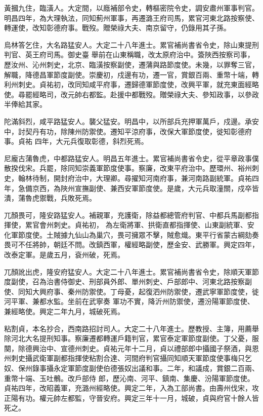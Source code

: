 \begin{pinyinscope}
 黃摑九住，臨潢人。大定間，以廕補部令史，轉樞密院令史，調安肅州軍事判官。明昌四年，為大理執法，同知薊州軍事，再遷潞王府司馬，累官河東北路按察使、轉運使，改知彰德府事。戰歿。贈榮祿大夫、南京留守，仍錄用其子孫。



 烏林答乞住，大名路猛安人。大定二十八年進士。累官補尚書省令史，除山東提刑判官、英王府司馬。御史臺
 舉前在山東稱職，改太原府治中。簽陜西按察司事，歷汝州、沁州刺史，北京、臨潢按察副使，遷蒲與路節度使。未幾，以罪奪三官，解職，降德昌軍節度副使。崇慶初，戍邊有功，遷一官，賞銀百兩、重幣十端，轉利州刺史。貞祐初，改同知咸平府事，遷歸德軍節度使，改興平軍，就充東面經略使。尋罷經略司，改元帥右都監。赴援中都戰歿。贈榮祿大夫、參知政事，以參政半俸給其家。



 陀滿斜烈，咸平路猛安人。襲父猛安。明昌中，以所部兵充押軍萬戶，戍邊。承安中，討契丹有功，除陳州防禦使。遷知平涼府事，改保大軍節度使，徙知彰德府事。貞祐
 四年，大元兵復取彰德，斜烈死焉。



 尼龐古蒲魯虎，中都路猛安人。明昌五年進士。累官補尚書省令史，從平章政事僕散揆伐宋。兵罷，除同知崇義軍節度使事。察廉，改東平府治中。歷環州、裕州刺史，翰林待制，開封府治中，大理卿。尋擢知河南府事，兼河南路副統軍。貞祐四年，急備京西，為陜州宣撫副使、兼西安軍節度使。是歲，大元兵取潼關，戍卒皆潰，蒲魯虎禦戰，兵敗死焉。



 兀顏畏可，隆安路猛安人。補親軍，充護衛，除益都總管府判官、中都兵馬副都指揮使，累官會州刺史。貞祐初，
 為左衛將軍、拱衛直都指揮使、山東副統軍、安化軍節度使。土賊據九仙山為巢穴，畏可擁眾不擊，賊愈熾。東平行省蒙古綱劾奏畏可不任將帥，朝廷不問。改鎮西軍，權經略副使，歷金安、武勝軍。興定四年，改泰定軍。是歲五月，袞州破，死焉。



 兀顏訛出虎，隆安府猛安人。大定二十八年進士。累官補尚書省令史，除順天軍節度副使，召為治書侍御史、刑部員外郎、單州刺史、戶部郎中、河東北路按察副使、同知大興府事、秦州防禦使。丁母憂，起復泗州防禦使，遷武寧軍節度使，徙河平軍、兼都水監。坐前在武寧奏
 軍功不實，降沂州防禦使，遷汾陽軍節度使、兼經略使。興定二年九月，城破死焉。



 粘割貞，本名抄合，西南路招討司人。大定二十八年進士。歷教授、主簿，用薦舉除河北大名提刑知事。察廉遷都轉運戶籍判官，累官泰定軍節度副使。丁父憂，服闋，除德興治中、宣德州刺史。貞祐元年十二月，貞以禮部郎中攝國子祭酒，與恩州刺史攝武衛軍副都指揮使粘割合達、河間府判官攝同知順天軍節度使事梅只乞奴、保州錄事攝永定軍節度副使伯德張奴出議和事。二年，和議成，賞銀二百兩、重幣十端、玉吐鶻。改戶部侍
 郎，歷沁南、河平、鎮南、集慶、汾陽軍節度使。貞祐四年，改昭義軍，充潞州經略使。興定二年，入為工部尚書。由壽州伐宋，攻正陽有功。權元帥左都監，守晉安府。興定三年十一月，城破，貞與府官十餘人皆死之。



\end{pinyinscope}